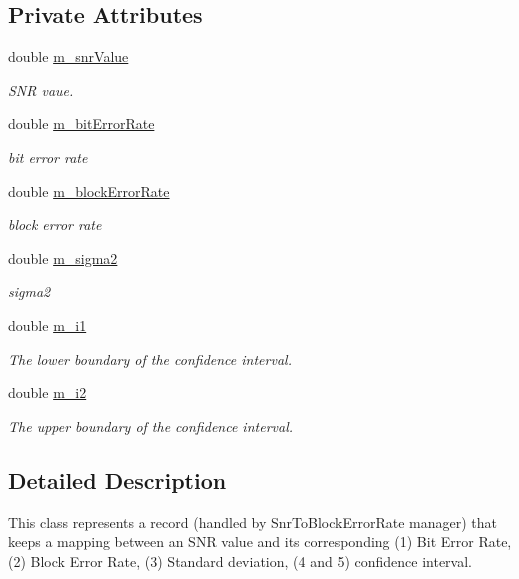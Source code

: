 \subsection*{Private Attributes}
\begin{DoxyCompactItemize}
\item 
double \hyperlink{classns3_1_1SNRToBlockErrorRateRecord_a1b6988516384bb6115566c985dcdc61b}{m\+\_\+snr\+Value}
\begin{DoxyCompactList}\small\item\em S\+NR vaue. \end{DoxyCompactList}\item 
double \hyperlink{classns3_1_1SNRToBlockErrorRateRecord_a4d1ddaa14b94ca55cc9bae9bd6221186}{m\+\_\+bit\+Error\+Rate}
\begin{DoxyCompactList}\small\item\em bit error rate \end{DoxyCompactList}\item 
double \hyperlink{classns3_1_1SNRToBlockErrorRateRecord_a4f426ac6ae4314945e90c8c9b5dd5ba3}{m\+\_\+block\+Error\+Rate}
\begin{DoxyCompactList}\small\item\em block error rate \end{DoxyCompactList}\item 
double \hyperlink{classns3_1_1SNRToBlockErrorRateRecord_ad49c69646813bd7e1688046daa26f4e8}{m\+\_\+sigma2}
\begin{DoxyCompactList}\small\item\em sigma2 \end{DoxyCompactList}\item 
double \hyperlink{classns3_1_1SNRToBlockErrorRateRecord_a185f61a6df9d3ff798e7548821085cd7}{m\+\_\+i1}
\begin{DoxyCompactList}\small\item\em The lower boundary of the confidence interval. \end{DoxyCompactList}\item 
double \hyperlink{classns3_1_1SNRToBlockErrorRateRecord_a8d1218ee9a15a85d9f3a1f3180d43841}{m\+\_\+i2}
\begin{DoxyCompactList}\small\item\em The upper boundary of the confidence interval. \end{DoxyCompactList}\end{DoxyCompactItemize}


\subsection{Detailed Description}
This class represents a record (handled by Snr\+To\+Block\+Error\+Rate manager) that keeps a mapping between an S\+NR value and its corresponding (1) Bit Error Rate, (2) Block Error Rate, (3) Standard deviation, (4 and 5) confidence interval. 

